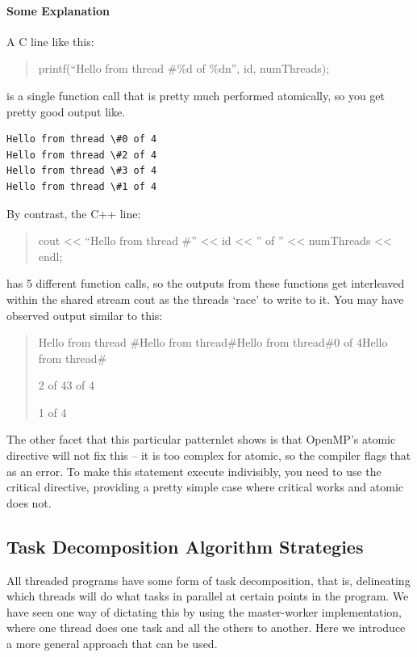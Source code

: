 \documentclass[letterpaper,10pt,openany,oneside]{sphinxmanual}
\begin{document}
\paragraph{Some Explanation}
\label{SharedMemory/MutualExclusion:some-explanation}
A C line like this:
\begin{quote}

printf(``Hello from thread \#\%d of \%dn'', id, numThreads);
\end{quote}

is a single function call that is pretty much performed atomically, so you get pretty good output like.

\begin{Verbatim}[commandchars=\\\{\}]
Hello from thread \#0 of 4
Hello from thread \#2 of 4
Hello from thread \#3 of 4
Hello from thread \#1 of 4
\end{Verbatim}

By contrast, the C++ line:
\begin{quote}

cout \textless{}\textless{} ``Hello from thread \#'' \textless{}\textless{} id \textless{}\textless{} '' of '' \textless{}\textless{} numThreads \textless{}\textless{} endl;
\end{quote}

has 5 different function calls, so the outputs from these functions get interleaved within the shared stream cout as the threads `race' to write to it.  You may have observed output similar to this:
\begin{quote}

Hello from thread \#Hello from thread\#Hello from thread\#0 of 4Hello from thread\#

2 of 43 of 4

1 of 4
\end{quote}

The other facet that this particular patternlet shows is that OpenMP's atomic directive will not fix this -- it is too complex for atomic, so the compiler flags that as an error.  To make this statement execute indivisibly, you need to use the critical directive, providing a pretty simple case where critical works and atomic does not.


\subsection{Task Decomposition Algorithm Strategies}
\label{SharedMemory/TaskDecomp:task-decomposition-algorithm-strategies}\label{SharedMemory/TaskDecomp::doc}
All threaded programs have some form of task decomposition, that is, delineating which threads will do what tasks in parallel at certain points in the program. We have seen one way of dictating this by using the master-worker implementation, where one thread does one task and all the others to another.  Here we introduce a more general approach that can be used.
\end{document}
